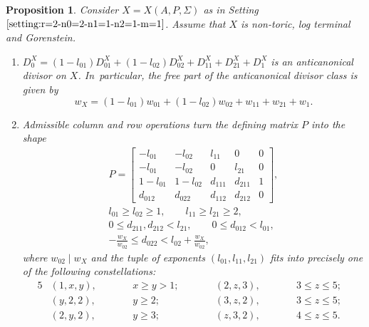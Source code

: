 \documentclass[pdftex]{sigma}%
\newtheorem{prop}[thm]{Proposition}
\theoremstyle{definition}
\numberwithin{equation}{section}
\begin{document}
\begin{prop}\label{prop:sample-1}\samepage
Consider $X = X(A,P,\Sigma)$ as in
Setting~$\ref{setting:r=2-n0=2-n1=1-n2=1-m=1}$.
Assume that $X$ is non-toric, log terminal
and Gorenstein.
\begin{enumerate}\itemsep=0pt
\item[$(i)$]
$D_0^X = (1-l_{01})D_{01}^X + (1-l_{02})D_{02}^X + D_{11}^X + D_{21}^X + D_1^X$
is an anticanonical divisor on $X$.
In~particular, the free part of the anticanonical divisor class
is given by
\[
w_X = (1-l_{01})w_{01} + (1-l_{02})w_{02} + w_{11} + w_{21} + w_{1}.
\]
\item[$(ii)$]
Admissible column and row operations turn
the defining matrix $P$ into the shape
\begin{gather*}
P
 =
\begin{bmatrix}
-l_{01} & -l_{02} & l_{11} & 0 & 0
\\
-l_{01} & -l_{02} & 0 & l_{21} & 0
\\
1-l_{01} & 1-l_{02} & d_{111} & d_{211} & 1
\\
d_{012} & d_{022} & d_{112} & d_{212} & 0
\end{bmatrix},
\\[1ex]
l_{01} \ge l_{02} \ge 1, \qquad
 l_{11} \ge l_{21} \ge 2,
\\[1ex]
 0 \le d_{211}, d_{212} < l_{21},\qquad
 0 \le d_{012} < l_{01},
\\[1ex]
 -\frac{w_X}{w_{02}} \le d_{022} < l_{02} + \frac{w_X}{w_{02}},
\end{gather*}
where $w_{02} \mid w_X$ and the tuple of exponents
$(l_{01},l_{11},l_{21})$
fits into precisely one of the following constellations:
\begin{alignat*}{5}
& (1,x,y), \qquad &&x \ge y > 1; \qquad && (2,z,3), \qquad &&3 \le z \le 5;&
\\
&(y,2,2), \qquad &&y \ge 2; \qquad && (3,z,2), \qquad &&3 \le z \le 5;&
\\
&(2,y,2), \qquad &&y \ge 3; \qquad && (z,3,2), \qquad && 4 \le z \le 5.&
\end{alignat*}
\end{enumerate}
\end{prop}
\end{document}
